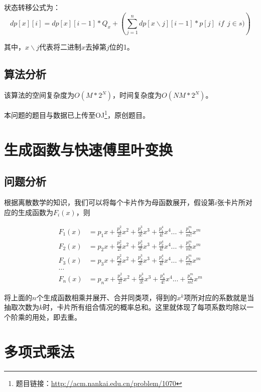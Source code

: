 \documentclass[master]{thesis-uestc}
\begin{document}
状态转移公式为：
$$
dp[x][i]=dp[x][i-1]*{Q_x}+(\sum\limits_{j=1}^{n}{dp[x \backslash j][i-1]*p[j]\ \ if\ \  j\in s)})
$$

其中，$x \backslash j$代表将二进制$x$去掉第$j$位的1。

\subsection{算法分析}

该算法的空间复杂度为$O(M*2^N)$，时间复杂度为$O(NM*2^N)$。

本问题的题目与数据已上传至OJ\footnote{题目链接：\url{http://acm.nankai.edu.cn/problem/1070} }，原创题目。

\section{生成函数与快速傅里叶变换}

\subsection{问题分析}

根据离散数学的知识，我们可以将每个卡片作为母函数展开，假设第$i$张卡片所对应的生成函数为$F_i(x)$，则

$$
\begin{array}{lll}
    

F_1(x) & =p_1x+\frac{p_1^2}{2!}x^2+\frac{p_1^3}{3!}x^3+\frac{p_1^4}{4!}x^4...+\frac{p_1^m}{m!}x^m \\


F_2(x) & =p_2x+\frac{p_2^2}{2!}x^2+\frac{p_2^3}{3!}x^3+\frac{p_2^4}{4!}x^4...+\frac{p_2^m}{m!}x^m \\

F_3(x) & =p_3x+\frac{p_3^2}{2!}x^2+\frac{p_3^3}{3!}x^3+\frac{p_3^4}{4!}x^4...+\frac{p_3^m}{m!}x^m \\

\dots \\

F_n(x) & =p_nx+\frac{p_n^2}{2!}x^2+\frac{p_n^3}{3!}x^3+\frac{p_n^4}{4!}x^4...+\frac{p_n^m}{m!}x^m

\end{array}
$$

将上面的$n$个生成函数相乘并展开、合并同类项，得到的$x^k$项所对应的系数就是当抽取次数为$k$时，卡片所有组合情况的概率总和。这里就体现了每项系数均除以一个阶乘的用处，即去重。

\section{多项式乘法}
\end{document}

